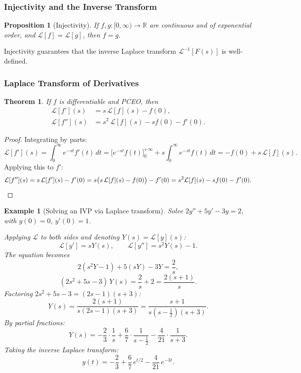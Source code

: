 \documentclass{article}
\newtheorem{theorem}{Theorem}
\newtheorem*{example}{Example}
\newtheorem{proposition}{Proposition}
\newcommand{\Lap}{\mathcal{L}}
\newcommand{\Linv}{\mathcal{L}^{-1}}
\newcommand{\R}{\mathbb{R}}
\begin{document}
\subsubsection{Injectivity and the Inverse Transform}

\begin{proposition}[Injectivity]
    If $f,g:[0,\infty)\to\R$ are continuous and of exponential order, and $\Lap[f] = \Lap[g]$, then $f = g$.
\end{proposition}

Injectivity guarantees that the inverse Laplace transform $\Linv[F(s)]$ is well-defined.

\subsubsection{Laplace Transform of Derivatives}

\begin{theorem}
    \label{thm:deriv}
    If $f$ is differentiable and PCEO, then
    \begin{align}
        \Lap[f'](s) &= s\,\Lap[f](s) - f(0), \label{eq:first-deriv}\\
        \Lap[f''](s) &= s^2\,\Lap[f](s) - sf(0) - f'(0). \label{eq:second-deriv}
    \end{align}
\end{theorem}

\begin{proof}
    Integrating by parts:
    \[\Lap[f'](s) = \int_0^\infty e^{-st}f'(t)\,dt = \Big[e^{-st}f(t)\Big]_0^{+\infty} + s\int_0^\infty e^{-st}f(t)\,dt = -f(0) + s\,\Lap[f](s).\]
    Applying this to $f'$:
    \[\Lap[f''](s) = s\,\Lap[f'](s) - f'(0) = s\bigl(s\,\Lap[f](s) - f(0)\bigr) - f'(0) = s^2\Lap[f](s) - sf(0) - f'(0). \qedhere\]
\end{proof}

\begin{example}[Solving an IVP via Laplace transform]
    Solve $2y'' + 5y' - 3y = 2$, with $y(0) = 0$, $y'(0) = 1$.

    Applying $\Lap$ to both sides and denoting $Y(s) = \Lap[y](s)$:
    \[\Lap[y'] = sY(s),\qquad \Lap[y''] = s^2Y(s) - 1.\]
    The equation becomes
    \[2(s^2Y - 1) + 5(sY) - 3Y = \frac{2}{s},\]
    \[(2s^2 + 5s - 3)\,Y(s) = \frac{2}{s} + 2 = \frac{2(s+1)}{s}.\]
    Factoring $2s^2 + 5s - 3 = (2s - 1)(s + 3)$:
    \[Y(s) = \frac{2(s+1)}{s(2s-1)(s+3)} = \frac{s+1}{s(s - \tfrac{1}{2})(s+3)}.\]
    By partial fractions:
    \[Y(s) = -\frac{2}{3}\cdot\frac{1}{s} + \frac{6}{7}\cdot\frac{1}{s - \frac{1}{2}} - \frac{4}{21}\cdot\frac{1}{s+3}.\]
    Taking the inverse Laplace transform:
    \[\boxed{y(t) = -\frac{2}{3} + \frac{6}{7}\,e^{t/2} - \frac{4}{21}\,e^{-3t}.}\]
\end{example}
\end{document}

